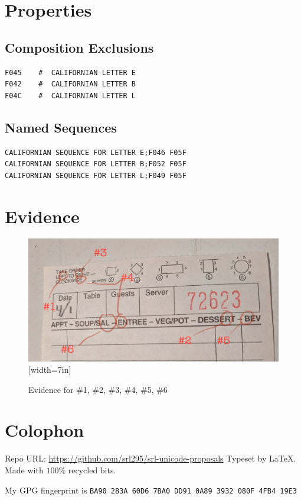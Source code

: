 \documentclass[12pt]{article}
\begin{document}
\section{Properties}
\subsection{Composition Exclusions}

\begin{verbatim}
F045    #  CALIFORNIAN LETTER E
F042    #  CALIFORNIAN LETTER B
F04C    #  CALIFORNIAN LETTER L
\end{verbatim}

\subsection{Named Sequences}

\begin{verbatim}
CALIFORNIAN SEQUENCE FOR LETTER E;F046 F05F
CALIFORNIAN SEQUENCE FOR LETTER B;F052 F05F
CALIFORNIAN SEQUENCE FOR LETTER L;F049 F05F
\end{verbatim}

\section{Evidence}

\begin{figure}[h]
\caption{Evidence for \#1, \#2, \#3, \#4, \#5, \#6}
\includegraphics{cal-f1.jpg}[width=7in]
\end{figure}

\section*{Colophon}

Repo URL: \small\url{https://github.com/srl295/srl-unicode-proposals} 
Typeset by \LaTeX . Made with \( 100\%  \) recycled bits.

My GPG fingerprint is {\tt BA90 283A 60D6 7BA0 DD91  0A89 3932 080F 4FB4 19E3}
\end{document}
